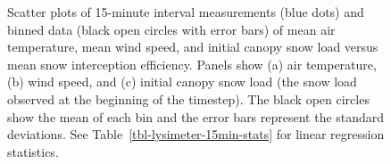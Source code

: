 \documentclass[
  letterpaper,
  DIV=11,
  numbers=noendperiod]{scrartcl}
\begin{document}
\begin{figure}


\caption{\label{fig-scl-ip-avg-15min}Scatter plots of 15-minute interval
measurements (blue dots) and binned data (black open circles with error
bars) of mean air temperature, mean wind speed, and initial canopy snow
load versus mean snow interception efficiency. Panels show (a) air
temperature, (b) wind speed, and (c) initial canopy snow load (the snow
load observed at the beginning of the timestep). The black open circles
show the mean of each bin and the error bars represent the standard
deviations. See Table~\ref{tbl-lysimeter-15min-stats} for linear
regression statistics.}

\end{figure}%
\end{document}
